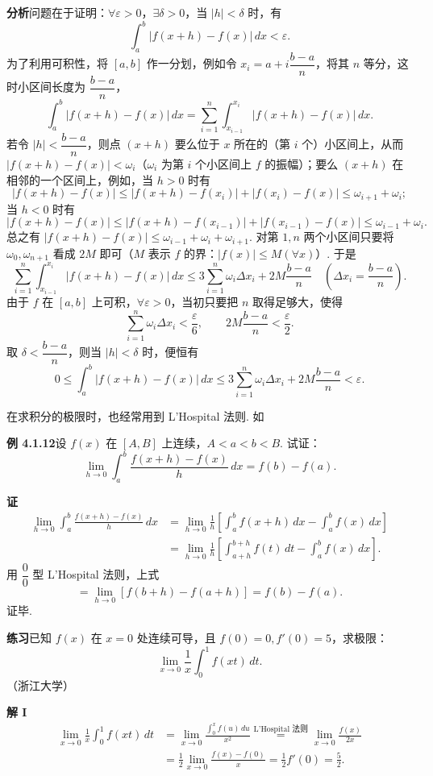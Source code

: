 \documentclass[UTF8,12pt,a4paper,fontset=fandol]{ctexart}
\begin{document}
\noindent\textbf{分析}\quad 问题在于证明：$\forall\varepsilon>0$，$\exists\delta>0$，当 $|h|<\delta$ 时，有
\[
\int_a^b|f(x+h)-f(x)|\,dx<\varepsilon.
\]
为了利用可积性，将 $[a,b]$ 作一分划，例如令 $x_i=a+i\dfrac{b-a}{n}$，将其 $n$ 等分，这时小区间长度为 $\dfrac{b-a}{n}$，
\[
\int_a^b|f(x+h)-f(x)|\,dx
=\sum_{i=1}^n\int_{x_{i-1}}^{x_i}|f(x+h)-f(x)|\,dx.
\]
若令 $|h|<\dfrac{b-a}{n}$，则点 $(x+h)$ 要么位于 $x$ 所在的（第 $i$ 个）小区间上，从而
$|f(x+h)-f(x)|<\omega_i$（$\omega_i$ 为第 $i$ 个小区间上 $f$ 的振幅）；要么 $(x+h)$ 在相邻的一个区间上，例如，当 $h>0$ 时有
\[
|f(x+h)-f(x)|\le |f(x+h)-f(x_i)|+|f(x_i)-f(x)|\le\omega_{i+1}+\omega_i;
\]
当 $h<0$ 时有
\[
|f(x+h)-f(x)|\le |f(x+h)-f(x_{i-1})|+|f(x_{i-1})-f(x)|
\le\omega_{i-1}+\omega_i.
\]
总之有 $|f(x+h)-f(x)|\le\omega_{i-1}+\omega_i+\omega_{i+1}$. 对第 $1,n$ 两个小区间只要将 $\omega_0,\omega_{n+1}$ 看成 $2M$ 即可（$M$ 表示 $f$ 的界：$|f(x)|\le M(\forall x)$）. 于是
\[
\sum_{i=1}^n\int_{x_{i-1}}^{x_i}|f(x+h)-f(x)|\,dx
\le 3\sum_{i=1}^n\omega_i\Delta x_i+2M\frac{b-a}{n}
\quad\left(\Delta x_i=\frac{b-a}{n}\right).
\]
由于 $f$ 在 $[a,b]$ 上可积，$\forall\varepsilon>0$，当初只要把 $n$ 取得足够大，使得
\[
\sum_{i=1}^n\omega_i\Delta x_i<\frac\varepsilon6,\qquad
2M\frac{b-a}{n}<\frac\varepsilon2.
\]
取 $\delta<\dfrac{b-a}{n}$，则当 $|h|<\delta$ 时，便恒有
\[
0\le\int_a^b|f(x+h)-f(x)|\,dx
\le3\sum_{i=1}^n\omega_i\Delta x_i+2M\frac{b-a}{n}<\varepsilon.
\]

在求积分的极限时，也经常用到 L'Hospital 法则. 如

\noindent\textbf{例 4.1.12}\quad 设 $f(x)$ 在 $[A,B]$ 上连续，$A<a<b<B$. 试证：
\[
\lim_{h\to0}\int_a^b\frac{f(x+h)-f(x)}{h}\,dx=f(b)-f(a).
\]

\noindent\textbf{证}\quad
\[
\begin{aligned}
\lim_{h\to0}\int_a^b\frac{f(x+h)-f(x)}{h}\,dx
&=\lim_{h\to0}\frac1h\left[\int_a^b f(x+h)\,dx-\int_a^b f(x)\,dx\right]\\
&=\lim_{h\to0}\frac1h\left[\int_{a+h}^{b+h}f(t)\,dt-\int_a^b f(x)\,dx\right].
\end{aligned}
\]
用 $\dfrac00$ 型 L'Hospital 法则，上式
\[
=\lim_{h\to0}[f(b+h)-f(a+h)]=f(b)-f(a).
\]
证毕.

\noindent\textbf{练习}\quad 已知 $f(x)$ 在 $x=0$ 处连续可导，且 $f(0)=0,f'(0)=5$，求极限：
\[
\lim_{x\to0}\frac1x\int_0^1 f(xt)\,dt.
\]
（浙江大学）

\noindent\textbf{解 I}\quad
\[
\begin{aligned}
\lim_{x\to0}\frac1x\int_0^1 f(xt)\,dt
&=\lim_{x\to0}\frac{\displaystyle\int_0^x f(u)\,du}{x^2}
\stackrel{\text{L'Hospital 法则}}{=}
\lim_{x\to0}\frac{f(x)}{2x}\\
&=\frac12\lim_{x\to0}\frac{f(x)-f(0)}x
=\frac12f'(0)=\frac52.
\end{aligned}
\]
\end{document}
